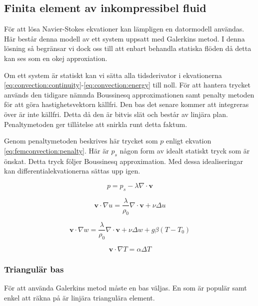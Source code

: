 \subsection{Finita element av inkompressibel fluid}

För att lösa Navier-Stokes ekvationer kan lämpligen en datormodell användas.
Här består denna modell av ett system uppsatt med Galerkins metod.
I denna lösning så begränsar vi dock oss till att enbart behandla statiska flöden
då detta kan ses som en okej approxiation.

Om ett system är statiskt kan vi sätta alla tidsderivator i ekvationerna
\eqref{eq:convection:continuity}-\eqref{eq:convection:energy} till noll.
För att hantera trycket används den tidigare nämnda Boussinesq approximationen
samt penalty metoden för att göra hastighetsvektorn källfri. Den bas det
senare kommer att integreras över är inte källfri. Detta då den är bitvis
slät och består av linjära plan. Penaltymetoden ger tillåtelse att snirkla
runt detta faktum.

Genom penaltymetoden beskrives här trycket som $p$ enligt ekvation
\eqref{eq:femconvection:penalty}. Här är $p_s$ någon form av idealt statiskt
tryck som är önskat. Detta tryck följer Boussinesq approximation. Med dessa
idealiseringar kan differentialekvationerna sättas upp igen.

\begin{equation}
\label{eq:femconvection:penalty}
p = p_s - \lambda\nabla\cdot\mathbf{v}
\end{equation}


\begin{equation}
\label{eq:femconvection:u}
\mathbf{v}\cdot\nabla u =
\frac{\lambda}{\rho_0}\nabla\cdot\mathbf{v} +
\nu\Delta u
\end{equation}

\begin{equation}
\label{eq:femconvection:w}
\mathbf{v}\cdot\nabla w =
\frac{\lambda}{\rho_0}\nabla\cdot\mathbf{v} + \nu\Delta w +g\beta(T-T_0)
\end{equation}

\begin{equation}
\label{eq:femconvection:T}
\mathbf{v}\cdot\nabla T = \alpha\Delta T
\end{equation}


\subsubsection{Triangulär bas}
För att använda Galerkins metod måste en bas väljas. En som är populär samt
enkel att räkna på är linjära triangulära element. 
